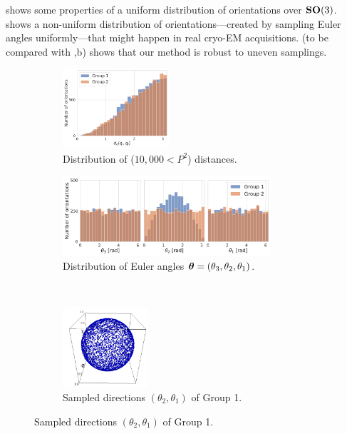  shows some properties of a uniform distribution of orientations over $\mathrm{\mathbf{SO}}(3)$.
 shows a non-uniform distribution of orientations---created by sampling Euler angles uniformly---that might happen in real cryo-EM acquisitions.
 (to be compared with ,b) shows that our method is robust to uneven samplings.

\begin{figure}[ht!]
    \centering
    \begin{subfigure}[b]{0.36\linewidth}
        \centering
        \includegraphics[height=8em]{figures/dQ_5j0n_uniform_quaternions_vs_angles.pdf}
        \caption{Distribution of ($10,000<P^2$) distances.}
    \end{subfigure}
    \hfill
    \begin{subfigure}[b]{0.62\linewidth}
        \centering
        \includegraphics[height=8em]{figures/uniform_quaternions_vs_angles_ang.pdf}
        \caption{Distribution of Euler angles ${\boldsymbol{\theta}} = (\theta_3,\theta_2,\theta_1)$.}
    \end{subfigure}
    \\ \vspace{1em}
    \begin{subfigure}[b]{0.18\linewidth}
        \centering
        \includegraphics[height=8em]{figures/uniform_quaternion.png}
        \caption{Sampled directions $(\theta_2, \theta_1)$ of Group 1.}

\end{subfigure}
\end{figure}
